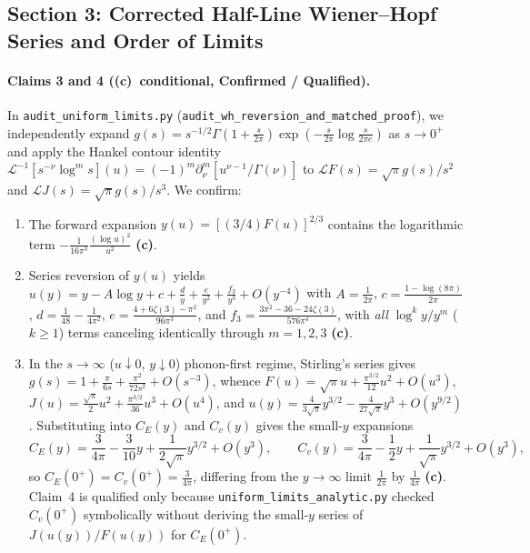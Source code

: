 \documentclass[11pt,a4paper]{article}
\newcommand{\C}{\textbf{(c)}}
\newcommand{\scr}[1]{\texttt{#1}}
\begin{document}
\subsection{Section 3: Corrected Half-Line Wiener--Hopf Series and Order of Limits}
\paragraph{Claims 3 and 4 (\C\ conditional, Confirmed / Qualified).}
In \scr{audit\_uniform\_limits.py} (\texttt{audit\_wh\_reversion\_and\_matched\_proof}),
we independently expand $g(s)=s^{-1/2}\Gamma(1+\frac{s}{2\pi})\exp(-\frac{s}{2\pi}\log\frac{s}{2\pi e})$
as $s\to 0^+$ and apply the Hankel contour identity
$\mathcal L^{-1}[s^{-\nu}\log^m s](u)=(-1)^m\partial_\nu^m[u^{\nu-1}/\Gamma(\nu)]$
to $\mathcal L F(s)=\sqrt{\pi}g(s)/s^2$ and $\mathcal L J(s)=\sqrt{\pi}g(s)/s^3$.
We confirm:
\begin{enumerate}
\item The forward expansion $y(u)=[(3/4)F(u)]^{2/3}$ contains the logarithmic term
$-\frac{1}{16\pi^3}\frac{(\log u)^2}{u^2}$ \C.
\item Series reversion of $y(u)$ yields
$u(y)=y-A\log y+c+\frac{d}{y}+\frac{e}{y^2}+\frac{f_3}{y^3}+O(y^{-4})$ with
$A=\frac{1}{2\pi}$, $c=\frac{1-\log(8\pi)}{2\pi}$,
$d=\frac{1}{48}-\frac{1}{4\pi^2}$,
$e=\frac{4+6\zeta(3)-\pi^2}{96\pi^3}$, and
$f_3=\frac{3\pi^2-36-24\zeta(3)}{576\pi^4}$, with \emph{all}
$\log^k y/y^m$ ($k\ge 1$) terms canceling identically through $m=1,2,3$ \C.
\item In the $s\to\infty$ ($u\downarrow 0$, $y\downarrow 0$) phonon-first regime,
Stirling's series gives $g(s)=1+\frac{\pi}{6s}+\frac{\pi^2}{72s^2}+O(s^{-3})$,
whence $F(u)=\sqrt{\pi}u+\frac{\pi^{3/2}}{12}u^2+O(u^3)$,
$J(u)=\frac{\sqrt{\pi}}{2}u^2+\frac{\pi^{3/2}}{36}u^3+O(u^4)$, and
$u(y)=\frac{4}{3\sqrt{\pi}}y^{3/2}-\frac{4}{27\sqrt{\pi}}y^3+O(y^{9/2})$.
Substituting into $C_E(y)$ and $C_v(y)$ gives the small-$y$ expansions
\begin{equation}
 C_E(y) = \frac{3}{4\pi} - \frac{3}{10}y + \frac{1}{2\sqrt{\pi}}y^{3/2} + O(y^3), \qquad
 C_v(y) = \frac{3}{4\pi} - \frac{1}{2}y + \frac{1}{\sqrt{\pi}}y^{3/2} + O(y^3), \label{eq:CE_Cv_small_y}
\end{equation}
so $C_E(0^+)=C_v(0^+)=\frac{3}{4\pi}$, differing from the $y\to\infty$ limit
$\frac{1}{2\pi}$ by $\frac{1}{4\pi}$ \C. Claim~4 is qualified only because
\scr{uniform\_limits\_analytic.py} checked $C_v(0^+)$ symbolically without
deriving the small-$y$ series of $J(u(y))/F(u(y))$ for $C_E(0^+)$.
\end{enumerate}
\end{document}
